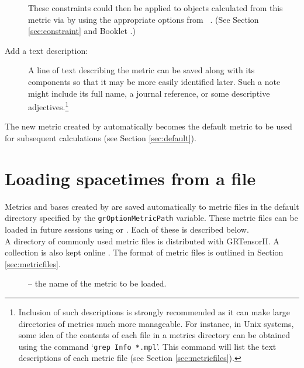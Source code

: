 \documentclass{article}
\begin{document}
\begin{description}
    These constraints could then be applied to objects calculated from this
    metric via  by using the appropriate options from \
    .
   (See Section \ref{sec:constraint} and Booklet \grCalcRef.)
%
  \item[Add a text description:]
    A line of text describing the metric can be saved along with its components
    so that it may be more easily identified later. Such a note might include
    its full name, a journal reference, or some descriptive
    adjectives.\footnote{
    Inclusion of such descriptions is strongly recommended as it can make
    large directories of metrics much more manageable. For instance, in Unix
    systems, some idea of the contents of each file in a metrics directory
    can be obtained using the command `\texttt{grep Info *.mpl}'.
    This command will list the text descriptions of each metric file (see
    Section \ref{sec:metricfiles}).}
\end{description}

The new metric created by  automatically becomes the default
metric to be used for subsequent calculations (see Section \ref{sec:default}).
%
\section{Loading spacetimes from a file} \label{qload}
%
Metrics and bases created by  are saved automatically to
metric files in the default directory specified by the
\texttt{grOptionMetricPath} variable. These metric files can be loaded
in future sessions using \grcmd{qload} or \grcmd{grload}. Each of
these is described below.\\

A directory of commonly used metric files is distributed with
GRTensorII.  A collection is also kept online \cite{www}. The format
of metric files is outlined in Section \ref{sec:metricfiles}.\\
%
\begin{cmdspec}
  \label{spec:qload}

  \begin{description}
    \item[] -- the name of the metric to be loaded.
  \end{description}

\end{cmdspec}
\end{document}
